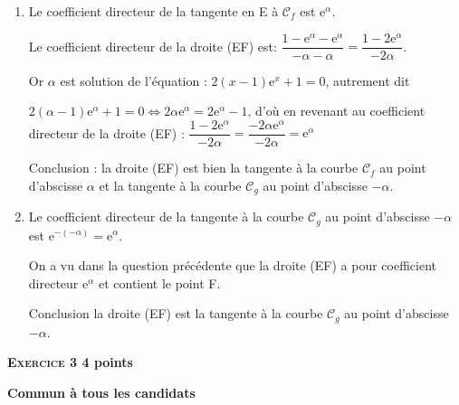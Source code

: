 \documentclass[10pt]{article}
\newcommand{\vect}[1]{\overrightarrow{\,\mathstrut#1\,}}
\def\Ouv{$\left(\text{O},~\vect{u},~\vect{v}\right)$}
\begin{document}
\begin{enumerate}
\item %
Le coefficient directeur de la tangente en E à $\mathcal{C}_{f}$ est $\text{e}^{\alpha}$.

Le coefficient directeur de la droite (EF) est: $\dfrac{1 - \text{e}^{\alpha} - \text{e}^{\alpha}}{- \alpha - \alpha} = \dfrac{1 - 2\text{e}^{\alpha}}{- 2\alpha}$.

Or $\alpha$ est solution de l'équation : $2(x - 1)\text{e}^x + 1 = 0$, autrement dit 

$2(\alpha - 1)\text{e}^{\alpha} + 1 = 0 \iff 2\alpha\text{e}^{\alpha} = 2\text{e}^{\alpha} - 1$, d'où en revenant au coefficient directeur de la droite (EF) : $\dfrac{1 - 2\text{e}^{\alpha}}{- 2\alpha} = \dfrac{- 2 \alpha\text{e}^{\alpha}}{-2\alpha} = \text{e}^{\alpha}$

Conclusion : la droite (EF) est bien la tangente à la courbe $\mathcal{C}_{f}$ au point d'abscisse $\alpha$ et la tangente à la courbe $\mathcal{C}_{g}$ au point d'abscisse $-\alpha$.

\item %
Le coefficient directeur de la tangente à la courbe $\mathcal{C}_{g}$ au point d'abscisse $- \alpha$ est $\text{e}^{- (- \alpha)} = \text{e}^{\alpha}.$

On a vu dans la question précédente que la droite (EF) a pour coefficient directeur $\text{e}^{\alpha}$ et contient le point F.

Conclusion la droite (EF) est la tangente à la courbe $\mathcal{C}_{g}$ au point d'abscisse $- \alpha$. 
\end{enumerate}

\vspace{0,5cm}

\textbf{\textsc{Exercice 3} \hfill 4 points}

\textbf{Commun  à tous les candidats}

\medskip

%
% 
%
%
\end{document}
